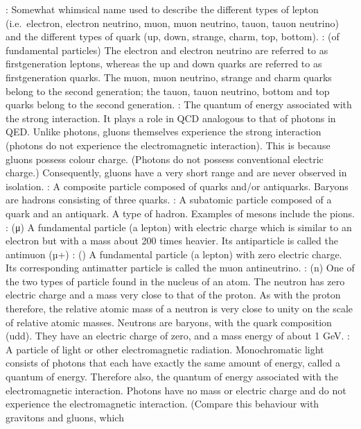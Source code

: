 \documentclass[letterpaper,10pt,english]{sphinxmanual}
\begin{document}
: Somewhat whimsical name used to describe the different types of lepton (i.e. electron, electron neutrino, muon, muon neutrino, tauon, tauon neutrino) and the different types of quark (up, down, strange, charm, top, bottom). : (of fundamental particles) The electron and electron neutrino are referred to as first\sphinxhyphen{}generation leptons, whereas the up and down quarks are referred to as first\sphinxhyphen{}generation quarks. The muon, muon neutrino, strange and charm quarks belong to the
second generation; the tauon, tauon neutrino, bottom and top quarks belong to the second generation. : The quantum of energy associated with the strong interaction. It plays a role in QCD analogous to that of photons in QED. Unlike photons, gluons themselves experience the strong interaction (photons do not experience the electromagnetic interaction). This is because gluons possess colour charge. (Photons do not possess conventional electric charge.) Consequently, gluons have a very
short range and are never observed in isolation. : A composite particle composed of quarks and/or antiquarks. Baryons are hadrons consisting of three quarks. : A subatomic particle composed of a quark and an antiquark. A type of hadron. Examples of mesons include the pions. : (μ\sphinxhyphen{}) A fundamental particle (a lepton) with electric charge \textendash{} which is similar to an electron but with a mass about 200 times heavier. Its antiparticle is called the antimuon (µ+) : () A fundamental particle (a lepton) with zero electric charge. Its corresponding antimatter particle is called the muon antineutrino. : (n) One of the two types of particle found in the nucleus of an atom. The neutron has zero electric charge and a mass very close to that of the proton. As with the proton therefore, the relative atomic mass of a neutron is very close to unity on the scale of relative atomic masses. Neutrons are baryons, with the quark composition (udd).
They have an electric charge of zero, and a mass energy of about 1 GeV. : A particle of light or other electromagnetic radiation. Monochromatic light consists of photons that each have exactly the same amount of energy, called a quantum of energy. Therefore also, the quantum of energy associated with the electromagnetic interaction. Photons have no mass or electric charge and do not experience the electromagnetic interaction. (Compare this behaviour with gravitons and gluons, which
\end{document}
